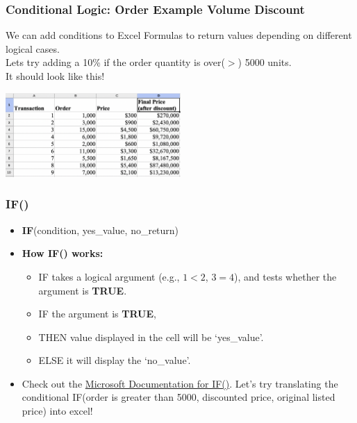 \documentclass[12pt]{beamer}
\begin{document}
	\begin{frame}
		\frametitle{Conditional Logic: Order Example Volume Discount}
		We can add conditions to Excel Formulas to return values depending on different logical cases. \\
		Lets try adding a 10\% if the order quantity is over($>$) 5000 units. \\
		It should look like this!
		\begin{center}
			\includegraphics[width=0.5\textwidth]{OrderConditional.png}
		\end{center}
	\end{frame}
	\begin{frame}
		\frametitle{IF()}
		\begin{itemize}
			\item \textbf{IF}(condition, yes\_value, no\_return)
			\item \textbf{How IF() works:}
			\begin{itemize}
				\item  IF takes a logical argument (e.g., $1<2$, $3=4$), and tests whether the argument is \textbf{TRUE}.
				\item  IF the argument is \textbf{TRUE},
				\item THEN value displayed in the cell will be `yes\_value'. \item ELSE it will display the `no\_value'.
			 \end{itemize}
			\item Check out the \textcolor{blue}{ \href{https://support.microsoft.com/en-us/office/if-function-69aed7c9-4e8a-4755-a9bc-aa8bbff73be2}{Microsoft Documentation for IF()}}. 
			\bigskip
			Let's try translating the conditional IF(order is greater than 5000, discounted price, original listed price) into excel!
	\end{itemize}
\end{frame}
\end{document}

